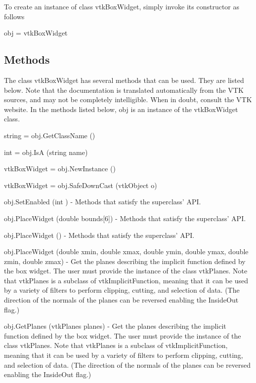 To create an instance of class vtk\-Box\-Widget, simply invoke its constructor as follows \begin{DoxyVerb}  obj = vtkBoxWidget
\end{DoxyVerb}
 \hypertarget{vtkwidgets_vtkxyplotwidget_Methods}{}\subsection{Methods}\label{vtkwidgets_vtkxyplotwidget_Methods}
The class vtk\-Box\-Widget has several methods that can be used. They are listed below. Note that the documentation is translated automatically from the V\-T\-K sources, and may not be completely intelligible. When in doubt, consult the V\-T\-K website. In the methods listed below, {\ttfamily obj} is an instance of the vtk\-Box\-Widget class. 
\begin{DoxyItemize}
\item {\ttfamily string = obj.\-Get\-Class\-Name ()}  
\item {\ttfamily int = obj.\-Is\-A (string name)}  
\item {\ttfamily vtk\-Box\-Widget = obj.\-New\-Instance ()}  
\item {\ttfamily vtk\-Box\-Widget = obj.\-Safe\-Down\-Cast (vtk\-Object o)}  
\item {\ttfamily obj.\-Set\-Enabled (int )} -\/ Methods that satisfy the superclass' A\-P\-I.  
\item {\ttfamily obj.\-Place\-Widget (double bounds\mbox{[}6\mbox{]})} -\/ Methods that satisfy the superclass' A\-P\-I.  
\item {\ttfamily obj.\-Place\-Widget ()} -\/ Methods that satisfy the superclass' A\-P\-I.  
\item {\ttfamily obj.\-Place\-Widget (double xmin, double xmax, double ymin, double ymax, double zmin, double zmax)} -\/ Get the planes describing the implicit function defined by the box widget. The user must provide the instance of the class vtk\-Planes. Note that vtk\-Planes is a subclass of vtk\-Implicit\-Function, meaning that it can be used by a variety of filters to perform clipping, cutting, and selection of data. (The direction of the normals of the planes can be reversed enabling the Inside\-Out flag.)  
\item {\ttfamily obj.\-Get\-Planes (vtk\-Planes planes)} -\/ Get the planes describing the implicit function defined by the box widget. The user must provide the instance of the class vtk\-Planes. Note that vtk\-Planes is a subclass of vtk\-Implicit\-Function, meaning that it can be used by a variety of filters to perform clipping, cutting, and selection of data. (The direction of the normals of the planes can be reversed enabling the Inside\-Out flag.)  

\end{DoxyItemize}
